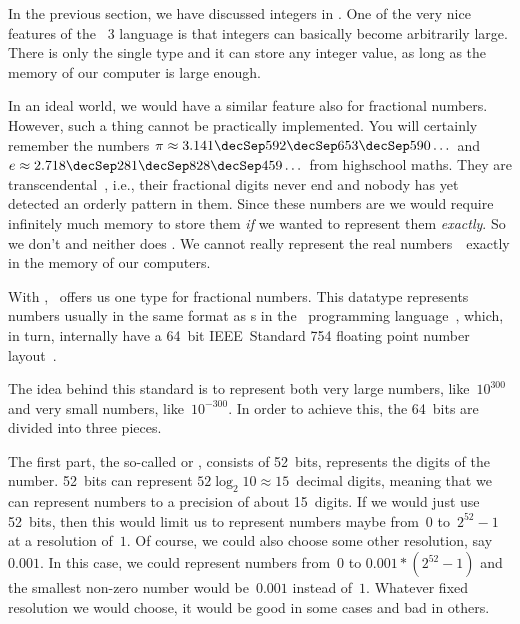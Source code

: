 %
%
In the previous section, we have discussed integers in \python.
One of the very nice features of the \python~3 language is that integers can basically become arbitrarily large.
There is only the single type  and it can store any integer value, as long as the memory of our computer is large enough.%
%
\begin{sloppypar}%
In an ideal world, we would have a similar feature also for fractional numbers.
However, such a thing cannot be practically implemented.
You will certainly remember the numbers $\pi\approx3.141\decSep592\decSep653\decSep590\dots$ and $e\approx2.718\decSep281\decSep828\decSep459\dots$ from highschool maths.
They are transcendental~\cite{N1939TTOP,APM1991TOEAP,F2011TTOEAP}, i.e., their fractional digits never end and nobody has yet detected an orderly pattern in them.
Since these numbers are  we would require infinitely much memory to store them \emph{if} we wanted to represent them \emph{exactly}.
So we don't and neither does \python.
We cannot really represent the real numbers~\realNumbers\ exactly in the memory of our computers.%
\end{sloppypar}%
%
%
\label{sec:howFloatingPointNumbersWork}%
With , \python\ offers us one type for fractional numbers.
This datatype represents numbers usually in the same format as s in the ~programming language~\cite{PSF2024NTIFC}, which, in turn, internally have a 64~bit IEEE~Standard 754 floating point number layout~\cite{IEEE2019ISFFPA,H1997IS7FPN}.

The idea behind this standard is to represent both very large numbers, like~$10^{300}$ and very small numbers, like~$10^{-300}$.
In order to achieve this, the 64~bits are divided into three pieces.

The first part, the so-called  or , consists of 52~bits, represents the digits of the number.
52~bits can represent $52\log_2 10\approx 15$~decimal digits, meaning that we can represent numbers to a precision of about 15~digits.
If we would just use 52~bits, then this would limit us to represent numbers maybe from~$0$ to~$2^{52}-1$ at a resolution of~$1$.
Of course, we could also choose some other resolution, say~$0.001$.
In this case, we could represent numbers from~$0$ to $0.001*(2^{52}-1)$ and the smallest non-zero number would be~$0.001$ instead of~$1$.
Whatever fixed resolution we would choose, it would be good in some cases and bad in others.

